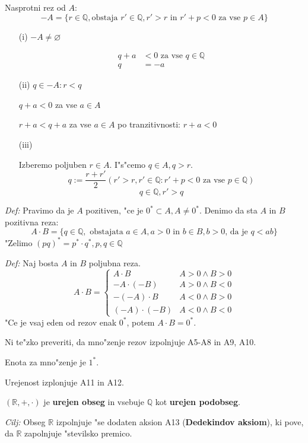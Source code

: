 Nasprotni rez od \(A\):
\[-A = \{r \in \mathbb{Q}, \text{obstaja } r' \in \mathbb{Q}, r' > r \text{ in } r' + p < 0 \text { za vse } p \in A\}\]
\begin{enumerate}
	\item[(i)] \(-A \neq \varnothing\)

	\begin{align*}
		q + a &< 0 \text{ za vse } q \in \mathbb{Q}\\
		q &= -a
	\end{align*}

	\item[(ii)] \(q \in -A: r < q\)

	\(q + a < 0\) za vse \(a \in A\)

	\(r + a < q + a\) za vse \(a \in A\) po tranzitivnosti: \(r + a < 0\)

	\item[(iii)]
	
	Izberemo poljuben $r \in A$. I"s"cemo $q \in A, q > r$.
	\[q := \frac{r + r'}{2} (r' > r, r' \in \mathbb{Q}: r' + p < 0 \text{ za vse } p \in \mathbb{Q})\]
	\[q \in \mathbb{Q}, r' > q\]
\end{enumerate}

\emph{Def:} Pravimo da je \(A\) pozitiven, "ce je \(0^* \subset A, A \neq 0^*\). Denimo da sta \(A\) in \(B\) pozitivna reza:
\[A \cdot B = \{q \in \mathbb{Q}, \text{ obstajata } a \in A, a > 0 \text{ in } b \in B, b > 0 \text{, da je } q < ab\}\]
"Zelimo $(pq)^* = p^* \cdot q^*, p, q \in \mathbb{Q}$

\emph{Def:} Naj bosta $A$ in $B$ poljubna reza.
\[
A \cdot B = \begin{cases}
A \cdot B & A > 0 \land B > 0\\
- A \cdot (-B) & A > 0 \land B < 0\\
- (-A) \cdot B & A < 0 \land B > 0\\
(-A) \cdot (-B) & A < 0 \land B < 0
\end{cases}
\]
"Ce je vsaj eden od rezov enak $0^*$, potem $A \cdot B = 0^*$.

Ni te"zko preveriti, da mno"zenje rezov izpolnjuje A5-A8 in A9, A10.

Enota za mno"zenje je $1^*$.

Urejenost izplonjuje A11 in A12.

$(\mathbb{R}, +, \cdot)$ je \textbf{urejen obseg} in vsebuje $\mathbb{Q}$ kot \textbf{urejen podobseg}.

\emph{Cilj:} Obseg $\mathbb{R}$ izpolnjuje "se dodaten aksion A13 (\textbf{Dedekindov aksiom}), ki pove, da $\mathbb{R}$ zapolnjuje "stevilsko premico.

